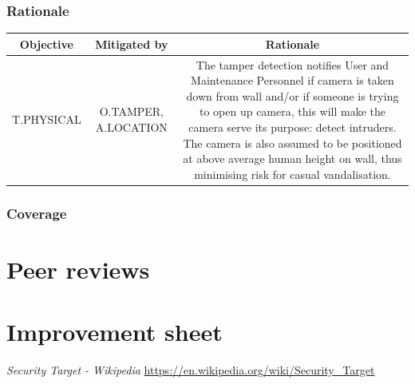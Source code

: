 \documentclass[10pt]{article}
\begin{document}
      \subsubsection{Rationale}
	
	\begin{center}

	\begin{tabular}{| c | c | c |}
	  \hline
	  Objective & Mitigated by & Rationale \\
	  \hline
	  T.PHYSICAL & O.TAMPER, A.LOCATION  & \parbox{6cm}{ The tamper detection notifies User and Maintenance Personnel if camera is taken down from wall and/or if someone is trying to open up camera, this will make the camera serve its purpose: detect intruders. The camera is also assumed to be positioned at above average human height on wall, thus minimising risk for casual vandalisation.} \\
	  \hline
	\end{tabular} 
	\end{center}

      \subsubsection{Coverage}
        

  \section{Peer reviews}

  \section{Improvement sheet}

  \begin{thebibliography}{9}
	 \textit{Security Target - Wikipedia} \url{https://en.wikipedia.org/wiki/Security_Target}
  \end{thebibliography}
\end{document}
